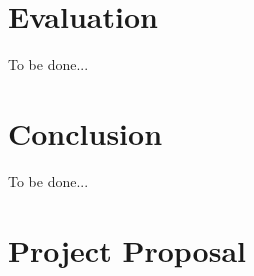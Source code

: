 \documentclass[12pt,a4paper,twoside,openright]{report}
\newcommand{\TOBEDONE}{{\LARGE To be done...}}
\begin{document}
\chapter{Evaluation}

\TOBEDONE

\chapter{Conclusion}

\TOBEDONE



\appendix

\chapter{Project Proposal}
\end{document}
